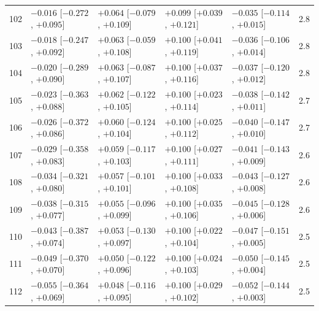 \begin{longtable}{rllllr}
102 & $-0.016$ {\scriptsize [$-0.272$, $+0.095$]} & $+0.064$ {\scriptsize [$-0.079$, $+0.109$]} & $+0.099$ {\scriptsize [$+0.039$, $+0.121$]} & $-0.035$ {\scriptsize [$-0.114$, $+0.015$]} & 2.8 \\
103 & $-0.018$ {\scriptsize [$-0.247$, $+0.092$]} & $+0.063$ {\scriptsize [$-0.059$, $+0.108$]} & $+0.100$ {\scriptsize [$+0.041$, $+0.119$]} & $-0.036$ {\scriptsize [$-0.106$, $+0.014$]} & 2.8 \\
104 & $-0.020$ {\scriptsize [$-0.289$, $+0.090$]} & $+0.063$ {\scriptsize [$-0.087$, $+0.107$]} & $+0.100$ {\scriptsize [$+0.037$, $+0.116$]} & $-0.037$ {\scriptsize [$-0.120$, $+0.012$]} & 2.8 \\
105 & $-0.023$ {\scriptsize [$-0.363$, $+0.088$]} & $+0.062$ {\scriptsize [$-0.122$, $+0.105$]} & $+0.100$ {\scriptsize [$+0.023$, $+0.114$]} & $-0.038$ {\scriptsize [$-0.142$, $+0.011$]} & 2.7 \\
106 & $-0.026$ {\scriptsize [$-0.372$, $+0.086$]} & $+0.060$ {\scriptsize [$-0.124$, $+0.104$]} & $+0.100$ {\scriptsize [$+0.025$, $+0.112$]} & $-0.040$ {\scriptsize [$-0.147$, $+0.010$]} & 2.7 \\
107 & $-0.029$ {\scriptsize [$-0.358$, $+0.083$]} & $+0.059$ {\scriptsize [$-0.117$, $+0.103$]} & $+0.100$ {\scriptsize [$+0.027$, $+0.111$]} & $-0.041$ {\scriptsize [$-0.143$, $+0.009$]} & 2.6 \\
108 & $-0.034$ {\scriptsize [$-0.321$, $+0.080$]} & $+0.057$ {\scriptsize [$-0.101$, $+0.101$]} & $+0.100$ {\scriptsize [$+0.033$, $+0.108$]} & $-0.043$ {\scriptsize [$-0.127$, $+0.008$]} & 2.6 \\
109 & $-0.038$ {\scriptsize [$-0.315$, $+0.077$]} & $+0.055$ {\scriptsize [$-0.096$, $+0.099$]} & $+0.100$ {\scriptsize [$+0.035$, $+0.106$]} & $-0.045$ {\scriptsize [$-0.128$, $+0.006$]} & 2.6 \\
110 & $-0.043$ {\scriptsize [$-0.387$, $+0.074$]} & $+0.053$ {\scriptsize [$-0.130$, $+0.097$]} & $+0.100$ {\scriptsize [$+0.022$, $+0.104$]} & $-0.047$ {\scriptsize [$-0.151$, $+0.005$]} & 2.5 \\
111 & $-0.049$ {\scriptsize [$-0.370$, $+0.070$]} & $+0.050$ {\scriptsize [$-0.122$, $+0.096$]} & $+0.100$ {\scriptsize [$+0.024$, $+0.103$]} & $-0.050$ {\scriptsize [$-0.145$, $+0.004$]} & 2.5 \\
112 & $-0.055$ {\scriptsize [$-0.364$, $+0.069$]} & $+0.048$ {\scriptsize [$-0.116$, $+0.095$]} & $+0.100$ {\scriptsize [$+0.029$, $+0.102$]} & $-0.052$ {\scriptsize [$-0.144$, $+0.003$]} & 2.5 \\

\end{longtable}
